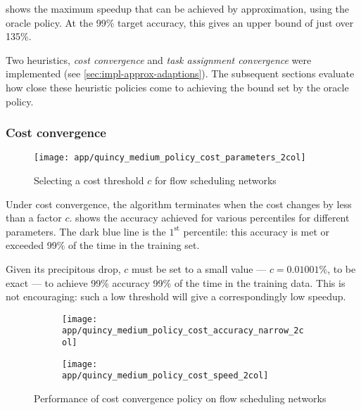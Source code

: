  shows the maximum speedup that can be achieved by approximation, using the oracle policy. At the 99\% target accuracy, this gives an upper bound of just over 135\%.

Two heuristics, \emph{cost convergence} and \emph{task assignment convergence} were implemented (see \cref{sec:impl-approx-adaptions}). The subsequent sections evaluate how close these heuristic policies come to achieving the bound set by the oracle policy.

\subsubsection{Cost convergence}

\begin{figure}
    \centering
    \texttt{[image: app/quincy\_medium\_policy\_cost\_parameters\_2col]}
    \caption{Selecting a cost threshold $c$ for flow scheduling networks}
    \label{fig:app-quincy-medium-cost-parameters}
\end{figure}

Under cost convergence, the algorithm terminates when the cost changes by less than a factor $c$.  shows the accuracy achieved for various percentiles for different parameters. The dark blue line is the $1^{\mathrm{st}}$ percentile: this accuracy is met or exceeded 99\% of the time in the training set. 

Given its precipitous drop, $c$ must be set to a small value --- $c = 0.01001\%$, to be exact --- to achieve 99\% accuracy 99\% of the time in the training data. This is not encouraging: such a low threshold will give a correspondingly low speedup. 

\begin{figure}
    \begin{widepage}
        \begin{subfigure}[c]{0.5\textwidth}
            \texttt{[image: app/quincy\_medium\_policy\_cost\_accuracy\_narrow\_2col]}
        \end{subfigure}
        \begin{subfigure}[c]{0.5\textwidth}
            \texttt{[image: app/quincy\_medium\_policy\_cost\_speed\_2col]}
        \end{subfigure}
    \end{widepage}
    \caption{Performance of cost convergence policy on flow scheduling networks}
    \label{fig:app-quincy-medium-cost-cdf}
\end{figure}


